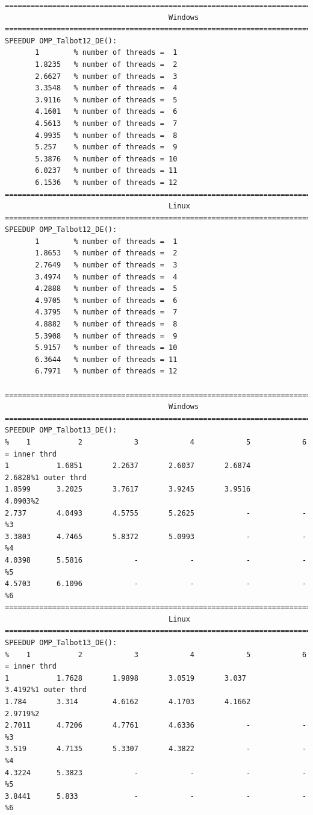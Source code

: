 \documentclass[a4paper,10pt]{report}%
\begin{document}
\begin{lstlisting}
====================================================================================
                                      Windows
====================================================================================
SPEEDUP OMP_Talbot12_DE():
       1        % number of threads =  1
       1.8235   % number of threads =  2
       2.6627   % number of threads =  3
       3.3548   % number of threads =  4
       3.9116   % number of threads =  5
       4.1601   % number of threads =  6
       4.5613   % number of threads =  7
       4.9935   % number of threads =  8
       5.257    % number of threads =  9
       5.3876   % number of threads = 10
       6.0237   % number of threads = 11
       6.1536   % number of threads = 12
====================================================================================
                                      Linux
====================================================================================
SPEEDUP OMP_Talbot12_DE():
       1        % number of threads =  1
       1.8653   % number of threads =  2
       2.7649   % number of threads =  3
       3.4974   % number of threads =  4
       4.2888   % number of threads =  5
       4.9705   % number of threads =  6
       4.3795   % number of threads =  7
       4.8882   % number of threads =  8
       5.3908   % number of threads =  9
       5.9157   % number of threads = 10
       6.3644   % number of threads = 11
       6.7971   % number of threads = 12

====================================================================================
                                      Windows
====================================================================================
SPEEDUP OMP_Talbot13_DE():
%    1           2            3            4            5            6 = inner thrd
1           1.6851       2.2637       2.6037       2.6874       2.6828%1 outer thrd
1.8599      3.2025       3.7617       3.9245       3.9516       4.0903%2
2.737       4.0493       4.5755       5.2625            -            -%3
3.3803      4.7465       5.8372       5.0993            -            -%4
4.0398      5.5816            -            -            -            -%5
4.5703      6.1096            -            -            -            -%6
====================================================================================
                                      Linux
====================================================================================
SPEEDUP OMP_Talbot13_DE():
%    1           2            3            4            5            6 = inner thrd
1           1.7628       1.9898       3.0519       3.037        3.4192%1 outer thrd
1.784       3.314        4.6162       4.1703       4.1662       2.9719%2
2.7011      4.7206       4.7761       4.6336            -            -%3
3.519       4.7135       5.3307       4.3822            -            -%4
4.3224      5.3823            -            -            -            -%5
3.8441      5.833             -            -            -            -%6
\end{lstlisting}
\end{document}
